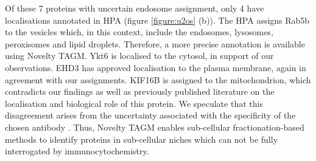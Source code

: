 \documentclass[12pt,english]{article}
\begin{document}
Of these 7 proteins with uncertain endosome assignment, only 4 have localisations annotated in HPA (figure \ref{figure:u2os} (b)). The HPA assigns Rab5b to the vesicles  which, in this context, include the endosomes, lysosomes, peroxisomes and lipid droplets. Therefore, a more precise annotation is available using Novelty TAGM. Ykt6 is localised to the cytosol, in support of our observations. EHD3 has approved localisation to the plasma membrane, again in agreement with our assignments. KIF16B is assigned to the mitochondrion, which contradicts our findings as well as previously published literature on the localisation and biological role of this protein. We speculate that this disagreement arises from the uncertainty associated with the specificity of the chosen antibody \citep{Thul:2017}. Thus, Novelty TAGM enables sub-cellular fractionation-based methods to identify proteins in sub-cellular niches which can not be fully interrogated by immunocytochemistry.
\end{document}
